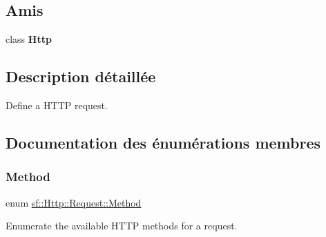 \subsection*{Amis}
\begin{DoxyCompactItemize}
\item 
\mbox{\label{classsf_1_1Http_1_1Request_aba95e2a7762bb5df986048b05d03a22e}} 
class {\bfseries Http}
\end{DoxyCompactItemize}


\subsection{Description détaillée}
Define a H\+T\+TP request. 

\subsection{Documentation des énumérations membres}
\mbox{\label{classsf_1_1Http_1_1Request_a620f8bff6f43e1378f321bf53fbf5598}} 
\subsubsection{\texorpdfstring{Method}{Method}}
{\footnotesize\ttfamily enum \hyperlink{classsf_1_1Http_1_1Request_a620f8bff6f43e1378f321bf53fbf5598}{sf\+::\+Http\+::\+Request\+::\+Method}}



Enumerate the available H\+T\+TP methods for a request. 

